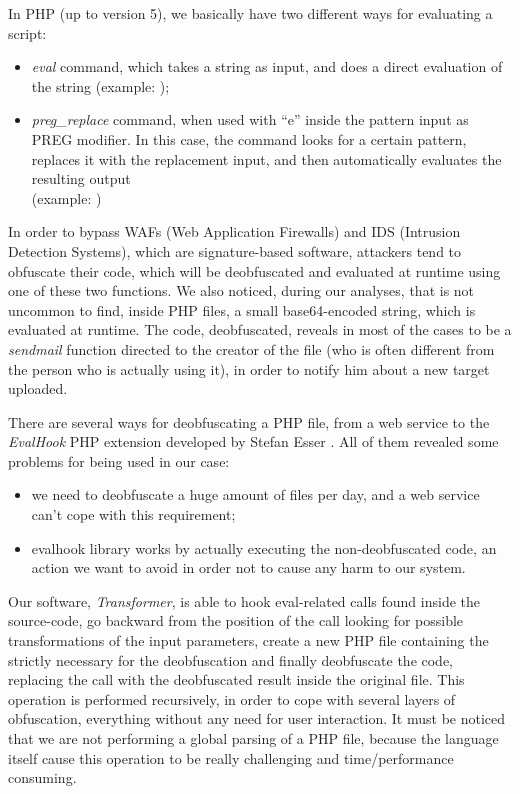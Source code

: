 In PHP (up to version 5), we basically have two different ways for evaluating a script:
\begin{itemize}
\item \emph{eval} command, which takes a string as input, and does a direct evaluation of the string (example: );
\item \emph{preg\_replace} command, when used with ``e'' inside the pattern input as PREG modifier. In this case, the command looks for a certain pattern, replaces it with the replacement input, and then automatically evaluates the resulting output\\(example: ) %
\end{itemize}

In order to bypass WAFs (Web Application Firewalls) and IDS (Intrusion Detection Systems), which are signature-based software, attackers tend to obfuscate their code, which will be deobfuscated and evaluated at runtime using one of these two functions.
We also noticed, during our analyses, that is not uncommon to find, inside PHP files, a small base64-encoded string, which is evaluated at runtime. The code, deobfuscated, reveals in most of the cases to be a \emph{sendmail} function directed to the creator of the file (who is often different from the person who is actually using it), in order to notify him about a new target uploaded.

There are several ways for deobfuscating a PHP file, from a web service \cite{webdeobf} to the \emph{EvalHook} PHP extension developed by Stefan Esser \cite{evalhook}. All of them revealed some problems for being used in our case:
\begin{itemize}
\item we need to deobfuscate a huge amount of files per day, and a web service can't cope with this requirement;
\item evalhook library works by actually executing the non-deobfuscated code, an action we want to avoid in order not to cause any harm to our system.
\end{itemize}

Our software, \emph{Transformer}, is able to hook eval-related calls found inside the source-code, go backward from the position of the call looking for possible transformations of the input parameters, create a new PHP file containing the strictly necessary for the deobfuscation and finally deobfuscate the code, replacing the call with the deobfuscated result inside the original file. This operation is performed recursively, in order to cope with several layers of obfuscation, everything without any need for user interaction.
It must be noticed that we are not performing a global parsing of a PHP file, because the language itself cause this operation to be really challenging and time/performance consuming.

